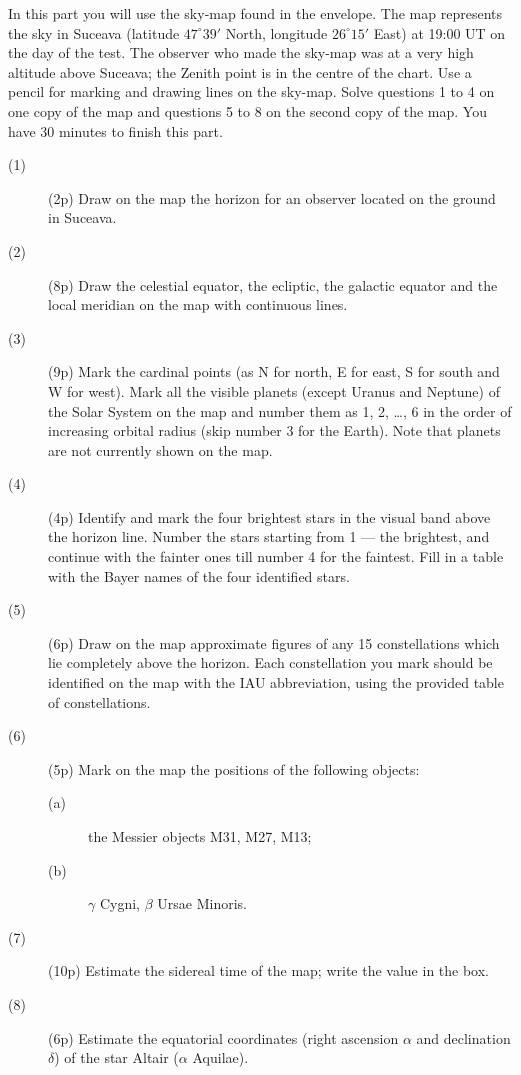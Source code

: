 In this part you will use the sky-map found in the envelope. The map
represents the sky in Suceava (latitude $47^\circ 39'$ North, longitude
$26^\circ 15'$ East) at 19:00 UT on the day of the test. The observer who
made the sky-map was at a very high altitude above Suceava; the Zenith point
is in the centre of the chart. Use a pencil for marking and drawing lines on
the sky-map. Solve questions 1 to 4 on one copy of the map and questions 5
to 8 on the second copy of the map. You have 30 minutes to finish this part.

\begin{description}
\item[(1)] (2p) Draw on the map the horizon for an observer located on the
  ground in Suceava.
\item[(2)] (8p) Draw the celestial equator, the ecliptic, the galactic
  equator and the local meridian on the map with continuous lines.
\item[(3)] (9p) Mark the cardinal points (as N for north, E for east, S for
  south and W for west). Mark all the visible planets (except Uranus and
  Neptune) of the Solar System on the map and number them as 1, 2, \ldots,
  6 in the order of increasing orbital radius (skip number 3 for the Earth).
  Note that planets are not currently shown on the map.
\item[(4)] (4p) Identify and mark the four brightest stars in the visual
  band above the horizon line. Number the stars starting from 1 --- the
  brightest, and continue with the fainter ones till number 4 for the
  faintest. Fill in a table with the Bayer names of the four identified
  stars.
\item[(5)] (6p) Draw on the map approximate figures of any 15 constellations
  which lie completely above the horizon. Each constellation you mark should
  be identified on the map with the IAU abbreviation, using the provided
  table of constellations.
\item[(6)] (5p) Mark on the map the positions of the following objects:
  \begin{description}
  \item[(a)] the Messier objects M31, M27, M13;
  \item[(b)] $\gamma$ Cygni, $\beta$ Ursae Minoris.
  \end{description}
\item[(7)] (10p) Estimate the sidereal time of the map; write the value in
  the box.
\item[(8)] (6p) Estimate the equatorial coordinates (right ascension
  $\alpha$ and declination $\delta$) of the star Altair ($\alpha$ Aquilae).
\end{description}

